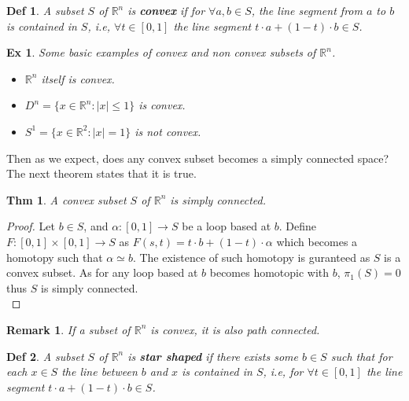 \documentclass[paper=a4, fontsize=11pt]{scrartcl}
\newtheorem{theorem}{Thm}
\newtheorem{definition}{Def}
\newtheorem{example}{Ex}
\newtheorem*{remark}{Remark}
\begin{document}
\begin{definition}
	A subset $S$ of $\mathbb{R}^n$ is \textbf{convex} if for $\forall a,b \in S$, the line segment from $a$ to $b$ is contained in $S$, i.e, $\forall t \in [0,1]$ the line segment $t\cdot a + (1-t)\cdot b \in S$.\\
\end{definition} 

\begin{example}
	Some basic examples of convex and non convex subsets of $\mathbb{R}^n$.
	\begin{itemize}
		\item $\mathbb{R}^n$ itself is convex.
		\item $D^n=\{x\in \mathbb{R}^n : |x|\leq 1 \}$ is convex.
		\item $S^1=\{x\in \mathbb{R}^2 : |x|=1\}$ is not convex.\\
	\end{itemize}
\end{example}

Then as we expect, does any convex subset becomes a simply connected space? The next theorem states that it is true.\\

\begin{theorem}
	A convex subset $S$ of $\mathbb{R}^n$ is simply connected.\\
\end{theorem}

\begin{proof}
	Let $b\in S$, and $\alpha:[0,1]\to S$ be a loop based at $b$. Define $F:[0,1]\times[0,1] \to S$ as $F(s,t)=t\cdot b + (1-t)\cdot \alpha$ which becomes a homotopy such that $\alpha \simeq b$. The existence of such homotopy is guranteed as $S$ is a convex subset. As for any loop based at $b$ becomes homotopic with $b$, $\pi_1(S)=0$ thus $S$ is simply connected.\\
\end{proof}

\begin{remark}
	If a subset of $\mathbb{R}^n$ is convex, it is also path connected.\\
\end{remark}

\begin{definition}
	A subset $S$ of $\mathbb{R}^n$ is \textbf{star shaped} if there exists some $b\in S$ such that for each $x \in S$ the line between $b$ and $x$ is contained in $S$, i.e, for $\forall t\in[0,1]$ the line segment $t\cdot a + (1-t)\cdot b \in S$.\\
\end{definition}
\end{document}
